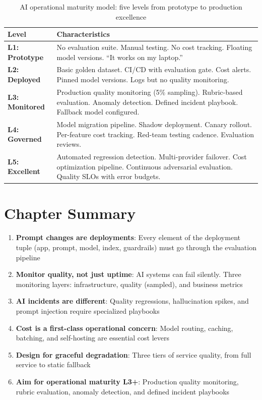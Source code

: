 \begin{table}[htbp]
\centering
\caption{AI operational maturity model: five levels from prototype to production excellence}
\label{tab:ai-maturity}
\begin{tabularx}{\textwidth}{lX}
\toprule
\textbf{Level} & \textbf{Characteristics} \\
\midrule
\textbf{L1: Prototype} & No evaluation suite. Manual testing. No cost tracking. Floating model versions. ``It works on my laptop.'' \\
\midrule
\textbf{L2: Deployed} & Basic golden dataset. CI/CD with evaluation gate. Cost alerts. Pinned model versions. Logs but no quality monitoring. \\
\midrule
\textbf{L3: Monitored} & Production quality monitoring (5\% sampling). Rubric-based evaluation. Anomaly detection. Defined incident playbook. Fallback model configured. \\
\midrule
\textbf{L4: Governed} & Model migration pipeline. Shadow deployment. Canary rollout. Per-feature cost tracking. Red-team testing cadence. Evaluation reviews. \\
\midrule
\textbf{L5: Excellent} & Automated regression detection. Multi-provider failover. Cost optimization pipeline. Continuous adversarial evaluation. Quality SLOs with error budgets. \\
\bottomrule
\end{tabularx}
\end{table}


\section{Chapter Summary}

\begin{enumerate}[leftmargin=*]
    \item \textbf{Prompt changes are deployments}: Every element of the deployment tuple (app, prompt, model, index, guardrails) must go through the evaluation pipeline
    \item \textbf{Monitor quality, not just uptime}: AI systems can fail silently. Three monitoring layers: infrastructure, quality (sampled), and business metrics
    \item \textbf{AI incidents are different}: Quality regressions, hallucination spikes, and prompt injection require specialized playbooks
    \item \textbf{Cost is a first-class operational concern}: Model routing, caching, batching, and self-hosting are essential cost levers
    \item \textbf{Design for graceful degradation}: Three tiers of service quality, from full service to static fallback
    \item \textbf{Aim for operational maturity L3+}: Production quality monitoring, rubric evaluation, anomaly detection, and defined incident playbooks
\end{enumerate}
